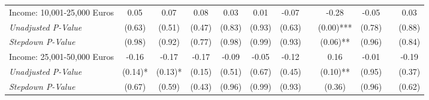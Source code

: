 \begin{tabular}{l c c c c c c c c c c c}
Income: 10,001-25,000 Euros & 0.05 & 0.07 & 0.08 & 0.03 & 0.01 & -0.07 & & -0.28 & -0.05 & & 0.03 \\
\quad \textit{Unadjusted P-Value} & (0.63) & (0.51) & (0.47) & (0.83) & (0.93) & (0.63) & & (0.00)*** & (0.78) & & (0.88) \\
\quad \textit{Stepdown P-Value} & (0.98) & (0.92) & (0.77) & (0.98) & (0.99) & (0.93) & & (0.06)** & (0.96) & & (0.84) \\
Income: 25,001-50,000 Euros & -0.16 & -0.17 & -0.17 & -0.09 & -0.05 & -0.12 & & 0.16 & -0.01 & & -0.19 \\
\quad \textit{Unadjusted P-Value} & (0.14)* & (0.13)* & (0.15) & (0.51) & (0.67) & (0.45) & & (0.10)** & (0.95) & & (0.37) \\
\quad \textit{Stepdown P-Value} & (0.67) & (0.59) & (0.43) & (0.96) & (0.99) & (0.93) & & (0.36) & (0.96) & & (0.62) \\
\bottomrule
\end{tabular}
